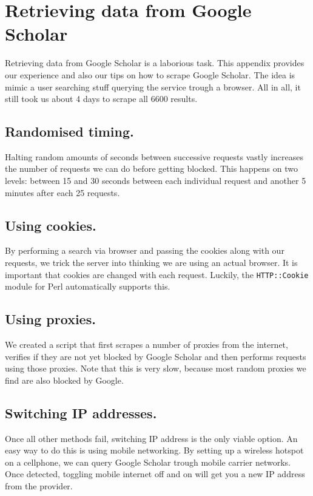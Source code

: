 \section{Retrieving data from Google Scholar}
\label{sec:googlescholar}

Retrieving data from Google Scholar is a laborious task. This appendix provides our experience and also our tips on how to scrape Google Scholar. The idea is mimic a user searching stuff querying the service trough a browser. All in all, it still took us about 4 days to scrape all 6600 results.

\subsection{Randomised timing.} 
Halting random amounts of seconds between successive requests vastly increases the number of requests we can do before getting blocked. This happens on two levels: between 15 and 30 seconds between each individual request and another 5 minutes after each 25 requests. 

\subsection{Using cookies.} 
By performing a search via browser and passing the cookies along with our requests, we trick the server into thinking we are using an actual browser. It is important that cookies are changed with each request. Luckily, the \texttt{HTTP::Cookie} module for Perl automatically supports this.

\subsection{Using proxies.}
We created a script that first scrapes a number of proxies from the internet, verifies if they are not yet blocked by Google Scholar and then performs requests using those proxies. Note that this is very slow, because most random proxies we find are also blocked by Google.

\subsection{Switching IP addresses.}
Once all other methods fail, switching IP address is the only viable option. An easy way to do this is using mobile networking. By setting up a wireless hotspot on a cellphone, we can query Google Scholar trough mobile carrier networks. Once detected, toggling mobile internet off and on will get you a new IP address from the provider.
